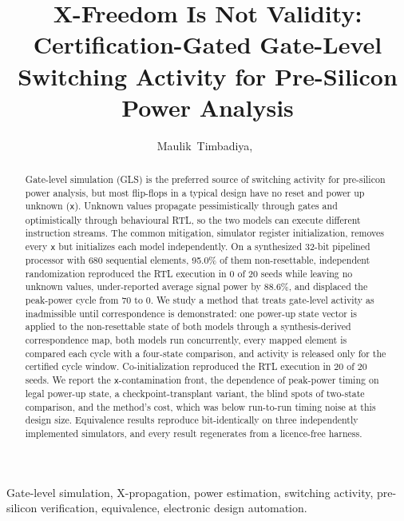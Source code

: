 \documentclass[journal]{IEEEtran}
\newcommand{\X}{\texttt{x}}
\begin{document}
\title{X-Freedom Is Not Validity: Certification-Gated Gate-Level Switching
Activity for Pre-Silicon Power Analysis}

\author{Maulik~Timbadiya,~}


\maketitle

\begin{abstract}
Gate-level simulation (GLS) is the preferred source of switching activity for
pre-silicon power analysis, but most flip-flops in a typical design have no
reset and power up unknown (\X). Unknown values propagate pessimistically
through gates and optimistically through behavioural RTL, so the two models can
execute different instruction streams. The common mitigation, simulator register
initialization, removes every \X{} but initializes each model independently. On
a synthesized 32-bit pipelined processor with 680 sequential elements, 95.0\% of
them non-resettable, independent randomization reproduced the RTL execution in
0 of 20 seeds while leaving no unknown values, under-reported average signal
power by 88.6\%, and displaced the peak-power cycle from 70 to 0. We study a
method that treats gate-level activity as inadmissible until correspondence is
demonstrated: one power-up state vector is applied to the non-resettable state of
both models through a synthesis-derived correspondence map, both models run
concurrently, every mapped element is compared each cycle with a four-state
comparison, and activity is released only for the certified cycle window.
Co-initialization reproduced the RTL execution in 20 of 20 seeds. We report the
\X-contamination front, the dependence of peak-power timing on legal power-up
state, a checkpoint-transplant variant, the blind spots of two-state comparison,
and the method's cost, which was below run-to-run timing noise at this design
size. Equivalence results reproduce bit-identically on three independently
implemented simulators, and every result regenerates from a licence-free
harness.
\end{abstract}

\begin{IEEEkeywords}
Gate-level simulation, X-propagation, power estimation, switching activity,
pre-silicon verification, equivalence, electronic design automation.
\end{IEEEkeywords}
\end{document}

